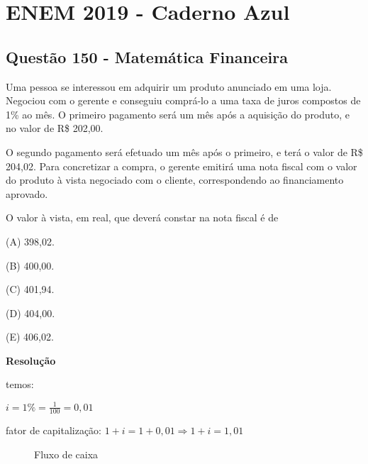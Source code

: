 \chapter{ENEM 2019 - Caderno Azul}

\section{Questão 150 - Matemática Financeira}

Uma pessoa se interessou em adquirir um produto anunciado em uma loja. Negociou com o gerente e conseguiu comprá-lo a uma taxa de juros compostos de 1\% ao mês. O primeiro pagamento será um mês após a aquisição do produto, e no valor de R\$ 202,00.

O segundo pagamento será efetuado um mês após o primeiro, e terá o valor de R\$ 204,02. Para concretizar a compra, o gerente emitirá uma nota fiscal com o valor do produto à vista negociado com o cliente, correspondendo ao financiamento aprovado.

O valor à vista, em real, que deverá constar na nota fiscal é de

(A) 398,02.

(B) 400,00.

(C) 401,94.

(D) 404,00.

(E) 406,02.

\textbf{Resolução}

temos: 

$ i = 1\% = \frac{1}{100} = 0,01 $

fator de capitalização: $ 1 + i = 1 + 0,01 \Longrightarrow 1 + i = 1,01 $

\begin{figure}[ht] \label{fluxo}
    \unitlength=1mm \caption{Fluxo de caixa}
\end{figure}

